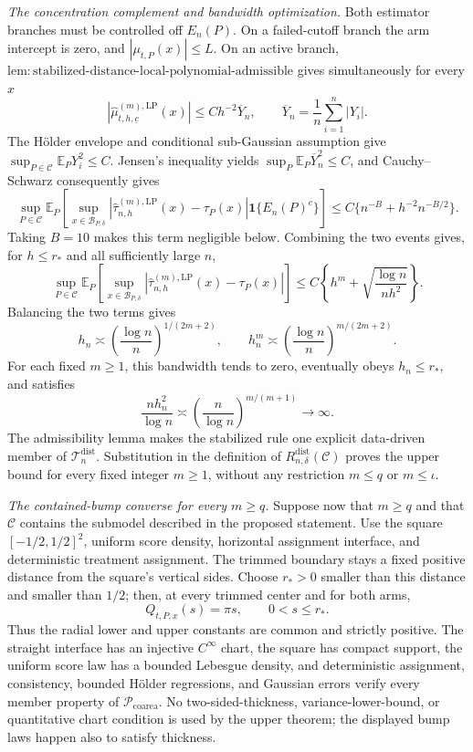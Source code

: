\emph{The concentration complement and bandwidth optimization.}
Both estimator branches must be controlled off \(E_n(P)\).  On a failed-cutoff branch the arm intercept is zero, and \(|\mu_{t,P}(x)|\leq L\).  On an active branch, \(\mathrm{lem:stabilized\text{-}distance\text{-}local\text{-}polynomial\text{-}admissible}\) gives simultaneously for every \(x\)
\[
 \left|\widehat\mu^{(m),\mathrm{LP}}_{t,h,\underline c}(x)\right|
 \leq Ch^{-2}\overline Y_n,
 \qquad
 \overline Y_n=\frac1n\sum_{i=1}^n|Y_i|.
\]
The H\"older envelope and conditional sub-Gaussian assumption give \(\sup_{P\in\mathcal C}\mathbb E_PY_i^2\leq C\).  Jensen's inequality yields \(\sup_P\mathbb E_P\overline Y_n^2\leq C\), and Cauchy--Schwarz consequently gives
\[
 \sup_{P\in\mathcal C}\mathbb E_P\!\left[
 \sup_{x\in\mathcal B_{P,\delta}}
 |\widehat\tau^{(m),\mathrm{LP}}_{n,h}(x)-\tau_P(x)|
 \mathbf1\{E_n(P)^c\}
 \right]
 \leq C\{n^{-B}+h^{-2}n^{-B/2}\}.
\]
Taking \(B=10\) makes this term negligible below.  Combining the two events gives, for \(h\leq r_*\) and all sufficiently large \(n\),
\[
 \sup_{P\in\mathcal C}\mathbb E_P\!\left[
 \sup_{x\in\mathcal B_{P,\delta}}
 |\widehat\tau^{(m),\mathrm{LP}}_{n,h}(x)-\tau_P(x)|
 \right]
 \leq C\left\{h^m+\sqrt{\frac{\log n}{nh^2}}\right\}.
\]
Balancing the two terms gives
\[
 h_n\asymp\left(\frac{\log n}{n}\right)^{1/(2m+2)},
 \qquad
 h_n^m\asymp\left(\frac{\log n}{n}\right)^{m/(2m+2)}.
\]
For each fixed \(m\geq1\), this bandwidth tends to zero, eventually obeys \(h_n\leq r_*\), and satisfies
\[
 \frac{nh_n^2}{\log n}
 \asymp\left(\frac n{\log n}\right)^{m/(m+1)}\longrightarrow\infty.
\]
The admissibility lemma makes the stabilized rule one explicit data-driven member of \(\mathcal T_n^{\mathrm{dist}}\).  Substitution in the definition of \(R_{n,\delta}^{\mathrm{dist}}(\mathcal C)\) proves the upper bound for every fixed integer \(m\geq1\), without any restriction \(m\leq q\) or \(m\leq\iota\).

\emph{The contained-bump converse for every \(m\geq q\).}
Suppose now that \(m\geq q\) and that \(\mathcal C\) contains the submodel described in the proposed statement.  Use the square \([-1/2,1/2]^2\), uniform score density, horizontal assignment interface, and deterministic treatment assignment.  The trimmed boundary stays a fixed positive distance from the square's vertical sides.  Choose \(r_*>0\) smaller than this distance and smaller than \(1/2\); then, at every trimmed center and for both arms,
\[
 Q_{t,P,x}(s)=\pi s,
 \qquad 0<s\leq r_*.
\]
Thus the radial lower and upper constants are common and strictly positive.  The straight interface has an injective \(C^\infty\) chart, the square has compact support, the uniform score law has a bounded Lebesgue density, and deterministic assignment, consistency, bounded H\"older regressions, and Gaussian errors verify every member property of \(\mathcal P_{\mathrm{coarea}}\).  No two-sided-thickness, variance-lower-bound, or quantitative chart condition is used by the upper theorem; the displayed bump laws happen also to satisfy thickness.

